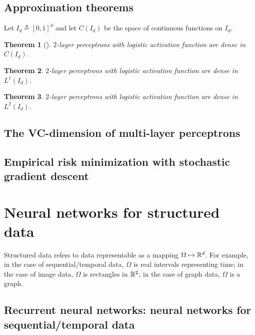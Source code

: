 \documentclass{article}
\newtheorem{theorem}{Theorem}
\begin{document}
\subsection{Approximation theorems}

Let $I_d \triangleq [0, 1]^d$ and let $C (I_d)$ be the space of continuous functions on $I_d$.

\begin{theorem}[\cite{cybenko1989approximation}]
$2$-layer perceptrons with logistic activation function are dense in $C (I_d)$.
\end{theorem}

\begin{theorem}
$2$-layer perceptrons with logistic activation function are dense in $L^1 (I_d)$.
\end{theorem}

\begin{theorem}
$2$-layer perceptrons with logistic activation function are dense in $L^2 (I_d)$.
\end{theorem}

\subsection{The VC-dimension of multi-layer perceptrons}

\subsection{Empirical risk minimization with stochastic gradient descent}

\section{Neural networks for structured data}

Structured data refers to data representable as a mapping $\Omega \mapsto {\mathbb R}^d$.
For example, in the case of sequential/temporal data, $\Omega$ is real intervals representing time;
in the case of image data, $\Omega$ is rectangles in ${\mathbb R}^2$;
in the case of graph data, $\Omega$ is a graph.

\subsection{Recurrent neural networks: neural networks for sequential/temporal data}
\end{document}
